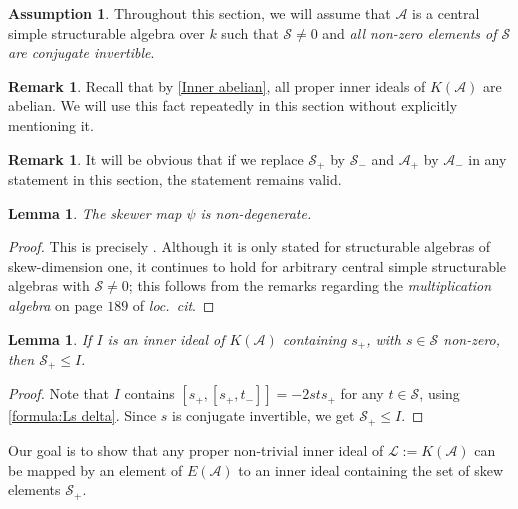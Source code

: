 \documentclass[oneside,a4paper]{amsart} %
\newtheorem{lemma}[theorem]{Lemma}
\theoremstyle{definition}
\newtheorem{remark}[theorem]{Remark}
\newtheorem{assumption}[theorem]{Assumption}
\newcommand{\A}{\mathcal{A}}
\renewcommand{\SS}{\mathcal{S}}
\newcommand{\LL}{\mathcal{L}}
\numberwithin{equation}{section}
\begin{document}
\begin{assumption}
\label{ass:skew}
    Throughout this section, we will assume that $\A$ is a central simple structurable algebra over $k$ such that $\SS \neq 0$ and \textit{all non-zero elements of $\SS$ are conjugate invertible}.
\end{assumption}



\begin{remark}
	Recall that by \cref{Inner abelian}, all proper inner ideals of $K(\A)$ are abelian.
	We will use this fact repeatedly in this section without explicitly mentioning it.
\end{remark}

\begin{remark}
	It will be obvious that if we replace $\SS_+$ by $\SS_-$ and $\A_+$ by $\A_-$ in any statement in this section, the statement remains valid.
\end{remark}

\begin{lemma}
\label{psi non-degenerate}
	The skewer map $\psi$ is non-degenerate.
\end{lemma}
\begin{proof}
	This is precisely \cite[Lemma 2.2]{Allison1984}. Although it is only stated for structurable algebras of skew-dimension one, it continues to hold for arbitrary central simple structurable algebras with $\SS\neq 0$; this follows from the remarks regarding the \textit{multiplication algebra} on page $189$ of \textit{loc.\@~cit}.
\end{proof}

\begin{lemma}
\label{Inner containing s}
	If $I$ is an inner ideal of $K(\A)$ containing $s_+$, with $s\in\SS$ non-zero, then $\SS_+\leq I$.
\end{lemma}
\begin{proof}
	Note that $I$ contains $[s_+,[s_+,t_-]]=-2sts_+$ for any $t\in\SS$, using \cref{formula:Ls delta}. Since $s$ is conjugate invertible, we get $\SS_+\leq I$.
\end{proof}

Our goal is to show that any proper non-trivial inner ideal of $\LL:=K(\A)$ can be mapped by an element of $E(\A)$ to an inner ideal containing the set of skew elements $\SS_+$.
\end{document}
